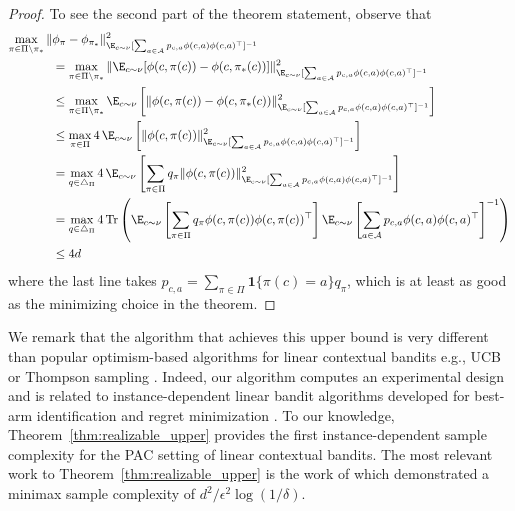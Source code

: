 \documentclass{article}
\newcommand{\mc}[1]{\mathcal{#1}}
\newcommand{\1}{\mathbf{1}}
\begin{document}
\begin{proof}
To see the second part of the theorem statement, observe that
\begin{align*}
    \max_{\pi \in \Pi \setminus \pi_*}\| & \phi_\pi  - \phi_{\pi_*} \|^2_{\E_{c \sim \nu}[ \sum_{a \in \mc{A}} p_{c,a} \phi(c,a) \phi(c,a)^{\top} ]^{-1}} \\
    &= \max_{\pi \in \Pi \setminus \pi_*} \| \E_{c \sim \nu}[ \phi(c,\pi(c)) - \phi(c,\pi_*(c)) ] \|^2_{\E_{c \sim \nu}[ \sum_{a \in \mc{A}} p_{c,a} \phi(c,a) \phi(c,a)^{\top} ]^{-1}} \\
    &\leq \max_{\pi \in \Pi \setminus \pi_*} \E_{c \sim \nu}\left[ \|  \phi(c,\pi(c)) - \phi(c,\pi_*(c))  \|^2_{\E_{c \sim \nu}[ \sum_{a \in \mc{A}} p_{c,a} \phi(c,a) \phi(c,a)^{\top} ]^{-1}} \right] \\
    &\leq \max_{\pi \in \Pi} 4 \, \E_{c \sim \nu}\left[ \|  \phi(c,\pi(c))  \|^2_{\E_{c \sim \nu}[ \sum_{a \in \mc{A}} p_{c,a} \phi(c,a) \phi(c,a)^{\top} ]^{-1}} \right] \\
    &= \max_{q \in \triangle_\Pi} 4 \, \E_{c \sim \nu}\left[ \sum_{\pi \in \Pi} q_\pi  \|  \phi(c,\pi(c))  \|^2_{\E_{c \sim \nu}[ \sum_{a \in \mc{A}} p_{c,a} \phi(c,a) \phi(c,a)^{\top} ]^{-1}} \right] \\
    &= \max_{q \in \triangle_\Pi} 4 \, \text{Tr}\left(  \E_{c \sim \nu}\left[ \sum_{\pi \in \Pi} q_\pi   \phi(c,\pi(c))  \phi(c,\pi(c))^\top \right] \E_{c \sim \nu}\left[ \sum_{a \in \mc{A}} p_{c,a} \phi(c,a) \phi(c,a)^{\top} \right]^{-1} \right)\\ &\leq 4 d
\end{align*}
where the last line takes $p_{c,a} = \sum_{\pi \in \Pi} \1\{ \pi(c) = a \} q_\pi$, which is at least as good as the minimizing choice in the theorem.
\end{proof}
We remark that the algorithm that achieves this upper bound is very different than popular optimism-based algorithms for linear contextual bandits e.g., UCB or Thompson sampling \cite{abbasi2011improved}.
Indeed, our algorithm computes an experimental design and is related to instance-dependent linear bandit algorithms developed for best-arm identification \cite{soare2014best,fiez2019sequential,degenne2020gamification} and regret minimization \cite{hao2020adaptive,tirinzoni2020asymptotically}.
To our knowledge, Theorem~\ref{thm:realizable_upper} provides the first instance-dependent sample complexity for the PAC setting of linear contextual bandits. 
The most relevant work to Theorem~\ref{thm:realizable_upper} is the work of \cite{zanette2021design} which demonstrated a minimax sample complexity of $d^2/\epsilon^2 \log(1/\delta)$.
\end{document}
